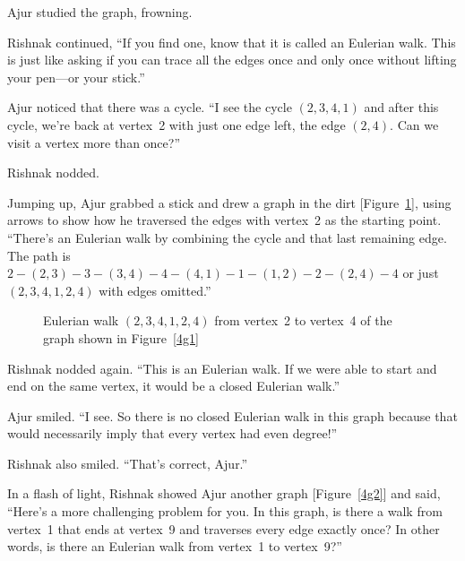 Ajur studied the graph, frowning.

Rishnak continued, ``If you find one, know that it is called an Eulerian walk. This is just like asking if you can trace all the edges once and only once without lifting your pen---or your stick.''

Ajur noticed that there was a cycle.  ``I see the cycle $(2,3,4,1)$ and after this cycle, we're back at vertex~2 with just one edge left, the edge $(2,4)$.  Can we visit a vertex more than once?''

Rishnak nodded.

Jumping up, Ajur grabbed a stick and drew a graph in the dirt [Figure~\ref{4g15}], using arrows to show how he traversed the edges with vertex~2 as the starting point. ``There's an Eulerian walk by combining the cycle and that last remaining edge. The path is $2-(2,3)-3-(3,4)-4-(4,1)-1-(1,2)-2-(2,4)-4$ or just $(2,3,4,1,2,4)$ with edges omitted.''

\begin{figure}
\begin{center}
\caption{Eulerian walk $(2,3,4,1,2,4)$ from vertex~2 to vertex~4 of the graph shown in Figure~\ref{4g1}}\label{4g15}
\end{center}
\end{figure}

Rishnak nodded again.  ``This is an Eulerian walk. If we were able to start and end on the same vertex, it would be a closed Eulerian walk.''

Ajur smiled. ``I see. So there is no closed Eulerian walk in this graph because that would necessarily imply that every vertex had even degree!''

Rishnak also smiled.  ``That's correct, Ajur.''

In a flash of light, Rishnak showed Ajur another graph [Figure~\ref{4g2}] and said, ``Here's a more challenging problem for you. In this graph, is there a walk from vertex~1 that ends at vertex~9 and traverses every edge exactly once?  In other words, is there an Eulerian walk from vertex~1 to vertex~9?''

